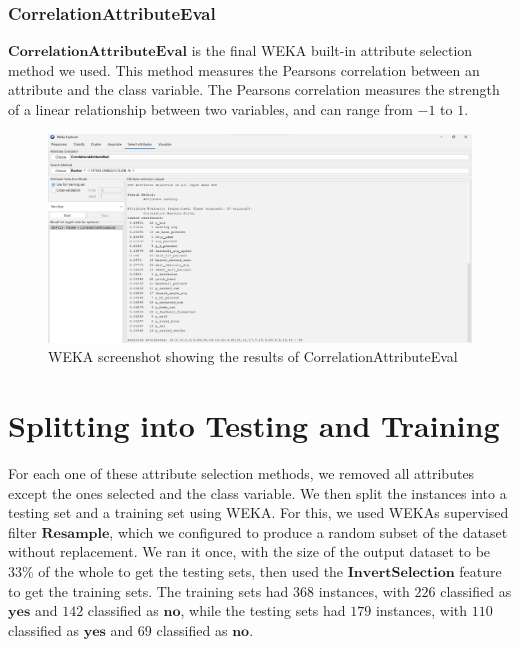 \documentclass[12pt]{article}
\begin{document}
\newpage
\subsubsection{CorrelationAttributeEval}
$\textbf{CorrelationAttributeEval}$ is the final WEKA built-in attribute selection method we used. This method measures the Pearson\textquotesingle s correlation between an attribute and the class variable. The Pearson\textquotesingle s correlation measures the strength of a linear relationship between two variables, and can range from $-1$ to $1$. 
\begin{figure}[h!]
    \includegraphics[scale=0.4]{./images/CorrelationAttributeEval/CorrelationAttributeEval.png}
    \centering
    \caption{WEKA screenshot showing the results of CorrelationAttributeEval}
    \label{fig:Correlation}
\end{figure}

\section{Splitting into Testing and Training}
For each one of these attribute selection methods, we removed all attributes except the ones selected and the class variable. We then split the instances into a testing set and a training set using WEKA. For this, we used WEKA\textquotesingle s supervised filter $\textbf{Resample}$, which we configured to produce a random subset of the dataset without replacement. We ran it once, with the size of the output dataset to be 33\% of the whole to get the testing sets, then used the $\textbf{InvertSelection}$ feature to get the training sets. The training sets had $368$ instances, with $226$ classified as $\textbf{yes}$ and $142$ classified as $\textbf{no}$, while the testing sets had $179$ instances, with $110$ classified as $\textbf{yes}$ and $69$ classified as $\textbf{no}$.
\end{document}
